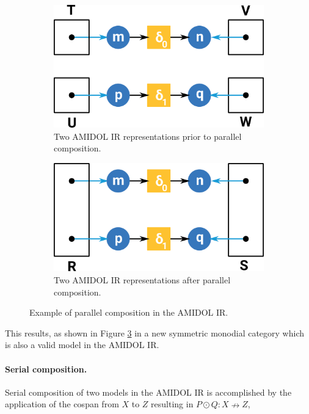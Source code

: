 \documentclass[12pt]{galois-whitepaper}
\begin{document}
  \begin{figure}
    \centering
    \begin{subfigure}[b]{0.45\textwidth}
      \includegraphics[width=\textwidth]{parallel-1.png}
      \caption{Two AMIDOL IR representations prior to parallel composition.}
      \label{Fig:Parallel-1}
    \end{subfigure}
        \begin{subfigure}[b]{0.45\textwidth}
      \includegraphics[width=\textwidth]{parallel-2.png}
      \caption{Two AMIDOL IR representations after parallel composition.}
      \label{Fig:Parallel-2}
    \end{subfigure}
    \caption{Example of parallel composition in the AMIDOL IR.}
    \label{Fig:Parallel}
  \end{figure}

This results, as shown in Figure \ref{Fig:Parallel} in a new symmetric
monodial category which is also a valid model in the AMIDOL IR.
  
\paragraph{Serial composition.}  Serial composition of two models in
the AMIDOL IR is accomplished by the application of the cospan from
$X$ to $Z$ resulting in $P \odot Q: X \nrightarrow Z$,
\end{document}

